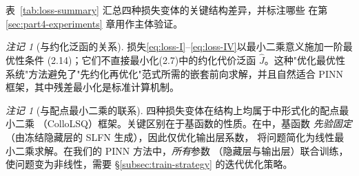 \documentclass{xmu}
\theoremstyle{plain}
\theoremstyle{remark}
\newtheorem{remark}[theorem]{注记}
\begin{document}
\label{subsubsec:loss-summary}

表~\ref{tab:loss-summary} 汇总四种损失变体的关键结构差异，并标注哪些
在第 \ref{sec:part4-experiments} 章用作主体验证。

\begin{table}[H]
\centering
\caption{四种损失变体的结构比较与使用范围。"主体使用"列标注该变体是否
在第 \ref{sec:part4-experiments} 章的主体数值实验中使用。}
\label{tab:loss-summary}
\end{table}

\begin{remark}[与约化泛函的关系]
损失\eqref{eq:loss-I}--\eqref{eq:loss-IV}以最小二乘意义施加一阶最优性条件
(2.14)；它们不直接最小化(2.7)中的约化代价泛函 $\hat J$。这种"优化最优性
系统"方法避免了"先约化再优化"范式所需的嵌套前向求解，并且自然适合 PINN
框架，其中残差最小化是标准计算机制。
\end{remark}

\begin{remark}[与配点最小二乘的联系]
四种损失变体在结构上均属于\cite{5}中形式化的配点最小二乘
（ColloLSQ）框架。关键区别在于基函数的性质。在\cite{5}中，基函数
\emph{先验固定}（由冻结隐藏层的 SLFN 生成），因此仅优化输出层系数，
将问题简化为线性最小二乘求解。在我们的 PINN 方法中，\emph{所有}参数
（隐藏层与输出层）联合训练，使问题变为非线性，需要
§\ref{subsec:train-strategy} 的迭代优化策略。
\end{remark}
\end{document}
